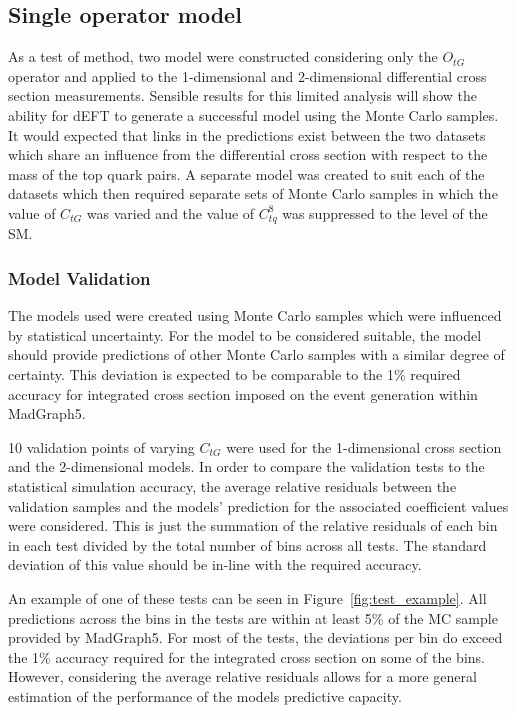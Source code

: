 \documentclass[a4paper,11pt]{article}
\begin{document}
\subsection{Single operator model}\label{sec:analysis_one_op}

As a test of method, two model were constructed considering only the $O_{tG}$ operator and applied to the 1-dimensional and 2-dimensional differential cross section measurements.
Sensible results for this limited analysis will show the ability for dEFT to generate a successful model using the Monte Carlo samples.
It would expected that links in the predictions exist between the two datasets which share an influence from the differential cross section with respect to the mass of the top quark pairs.
A separate model was created to suit each of the datasets which then required separate sets of Monte Carlo samples in which the value of $C_{tG}$ was varied and the value of $C_{tq}^{8}$ was suppressed to the level of the SM.


\subsubsection{Model Validation}

The models used were created using Monte Carlo samples which were influenced by statistical uncertainty.
For the model to be considered suitable, the model should provide predictions of other Monte Carlo samples with a similar degree of certainty.
This deviation is expected to be comparable to the 1\% required accuracy for integrated cross section imposed on the event generation within MadGraph5.

10 validation points of varying $C_{tG}$ were used for the 1-dimensional cross section and the 2-dimensional models.
In order to compare the validation tests to the statistical simulation accuracy, the average relative residuals between the validation samples and the models' prediction for the associated coefficient values were considered.
This is just the summation of the relative residuals of each bin in each test divided by the total number of bins across all tests.
The standard deviation of this value should be in-line with the required accuracy.

An example of one of these tests can be seen in Figure~\ref{fig:test_example}. All predictions across the bins in the tests are within at least 5\% of the MC sample provided by MadGraph5.
For most of the tests, the deviations per bin do exceed the 1\% accuracy required for the integrated cross section on some of the bins.
However, considering the average relative residuals allows for a more general estimation of the performance of the models predictive capacity.
\end{document}
